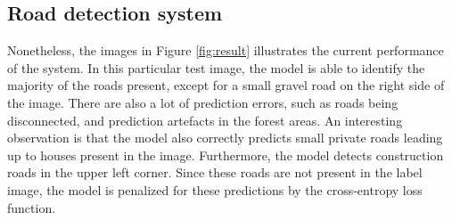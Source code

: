 \subsection{Road detection system}
\label{sec:results_road_detection_system}
Nonetheless, the images in Figure \ref{fig:result} illustrates the current performance of the system. In this particular test image, the model is able to identify the majority of the roads present, except for a small gravel road on the right side of the image. There are also a lot of prediction errors, such as roads being disconnected, and prediction artefacts in the forest areas. An interesting observation is that the model also correctly predicts small private roads leading up to houses present in the image. Furthermore, the model detects construction roads in the upper left corner. Since these roads are not present in the label image, the model is penalized for these predictions by the cross-entropy loss function.\\

